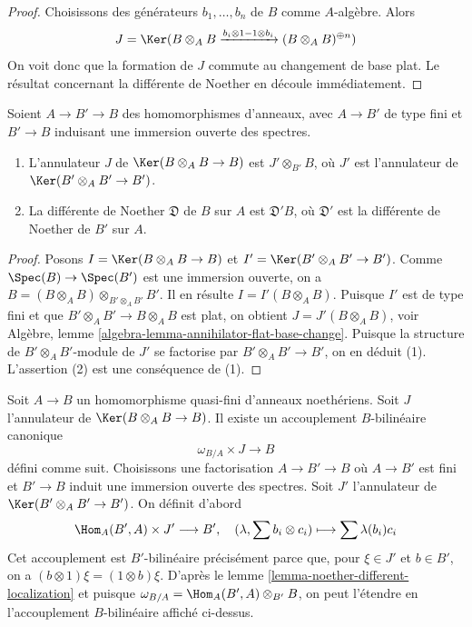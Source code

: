 \begin{proof}
Choisissons des générateurs $b_1, \ldots, b_n$ de $B$ comme $A$-algèbre.
Alors
$$
J = \Ker(B \otimes_A B \xrightarrow{b_i \otimes 1 - 1 \otimes b_i}
(B \otimes_A B)^{\oplus n})
$$
On voit donc que la formation de $J$ commute au changement de base plat.
Le résultat concernant la différente de Noether en découle immédiatement.
\end{proof}

\begin{lemma}
\label{lemma-noether-different-localization}
Soient $A \to B' \to B$ des homomorphismes d'anneaux, avec $A \to B'$
de type fini et $B' \to B$ induisant une immersion ouverte des spectres.
\begin{enumerate}
\item L'annulateur $J$ de $\Ker(B \otimes_A B \to B)$ est
$J' \otimes_{B'} B$, où $J'$ est l'annulateur de
$\Ker(B' \otimes_A B' \to B')$.
\item La différente de Noether $\mathfrak{D}$ de $B$ sur $A$ est
$\mathfrak{D}'B$, où $\mathfrak{D}'$ est
la différente de Noether de $B'$ sur $A$.
\end{enumerate}
\end{lemma}

\begin{proof}
Posons $I = \Ker(B \otimes_A B \to B)$ et $I' = \Ker(B' \otimes_A B' \to B')$.
Comme $\Spec(B) \to \Spec(B')$ est une immersion ouverte, on a
$B = (B \otimes_A B) \otimes_{B' \otimes_A B'} B'$. Il en résulte
$I = I'(B \otimes_A B)$. Puisque $I'$ est de type fini et que
$B' \otimes_A B' \to B \otimes_A B$ est plat, on obtient
$J = J'(B \otimes_A B)$, voir
Algèbre, lemme \ref{algebra-lemma-annihilator-flat-base-change}.
Puisque la structure de $B' \otimes_A B'$-module de $J'$
se factorise par $B' \otimes_A B' \to B'$, on en déduit (1).
L'assertion (2) est une conséquence de (1).
\end{proof}

\begin{remark}
\label{remark-construction-pairing}
Soit $A \to B$ un homomorphisme quasi-fini d'anneaux noethériens.
Soit $J$ l'annulateur de $\Ker(B \otimes_A B \to B)$.
Il existe un accouplement $B$-bilinéaire canonique
\begin{equation}
\label{equation-pairing-noether}
\omega_{B/A} \times J \longrightarrow B
\end{equation}
défini comme suit. Choisissons une factorisation $A \to B' \to B$
où $A \to B'$ est fini et $B' \to B$ induit une immersion ouverte
des spectres. Soit $J'$ l'annulateur de $\Ker(B' \otimes_A B' \to B')$.
On définit d'abord
$$
\Hom_A(B', A) \times J' \longrightarrow B',\quad
(\lambda, \sum b_i \otimes c_i) \longmapsto \sum \lambda(b_i)c_i
$$
Cet accouplement est $B'$-bilinéaire précisément parce que, pour $\xi \in J'$ et $b \in B'$,
on a $(b \otimes 1)\xi = (1 \otimes b)\xi$. D'après le
lemme \ref{lemma-noether-different-localization}
et puisque $\omega_{B/A} = \Hom_A(B', A) \otimes_{B'} B$,
on peut l'étendre en l'accouplement $B$-bilinéaire affiché ci-dessus.
\end{remark}

